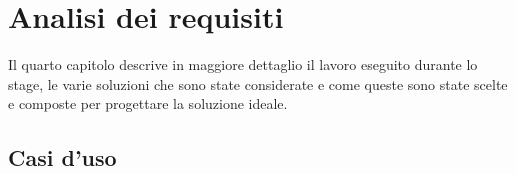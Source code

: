 
\chapter{Analisi dei requisiti}


Il quarto capitolo descrive in maggiore dettaglio il lavoro eseguito durante lo stage, le varie soluzioni che sono state considerate e come queste sono state scelte e composte per progettare la soluzione ideale.\\

\section{Casi d'uso}

